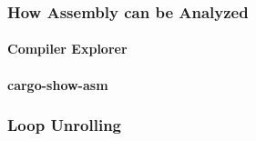 \subsubsection{How Assembly can be Analyzed}
\paragraph{Compiler Explorer}
\paragraph{cargo-show-asm}
\subsubsection{Loop Unrolling}
